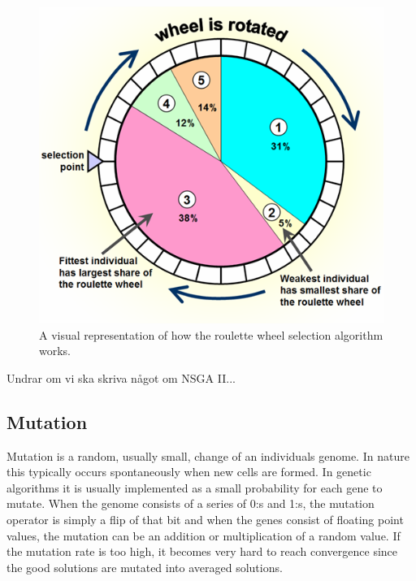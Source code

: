 \documentclass[a4paper,11pt]{kth-mag}
\begin{document}
\begin{figure}
\centering\includegraphics[scale=0.9]{roulettewheel.png}
\caption{A visual representation of how the roulette wheel selection algorithm works.}
\label{roulettewheelpic}
\end{figure}

Undrar om vi ska skriva något om NSGA II...
 
\subsection{Mutation}
Mutation is a random, usually small, change of an individuals genome. In nature this typically occurs spontaneously when new cells are formed. In genetic algorithms it is usually implemented as a small probability for each gene to mutate. When the genome consists of a series of 0:s and 1:s, the mutation operator is simply a flip of that bit and when the genes consist of floating point values, the mutation can be an addition or multiplication of a random value. If the mutation rate is too high, it becomes very hard to reach convergence since the good solutions are mutated into averaged solutions.
\end{document}
